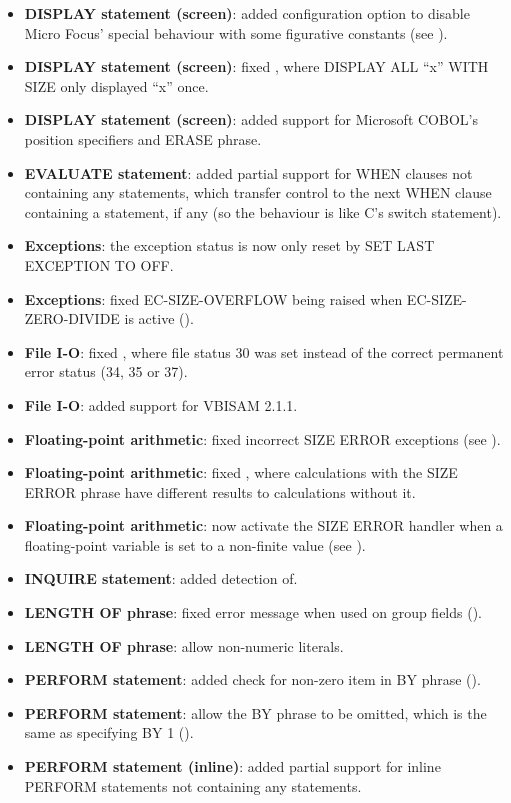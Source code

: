 \begin{itemize}
\item \textbf{DISPLAY statement (screen)}: added configuration option to disable Micro Focus' special behaviour with some figurative constants (see ).
\item \textbf{DISPLAY statement (screen)}: fixed , where DISPLAY ALL ``x'' WITH SIZE only displayed ``x'' once.
\item \textbf{DISPLAY statement (screen)}: added support for Microsoft COBOL's position specifiers and ERASE phrase.
\item \textbf{EVALUATE statement}: added partial support for WHEN clauses not containing any statements, which transfer control to the next WHEN clause containing a statement, if any (so the behaviour is like C's switch statement).
\item \textbf{Exceptions}: the exception status is now only reset by SET LAST EXCEPTION TO OFF.
\item \textbf{Exceptions}: fixed EC-SIZE-OVERFLOW being raised when EC-SIZE-ZERO-DIVIDE is active ().
\item \textbf{File I-O}: fixed , where file status 30 was set instead of the correct permanent error status (34, 35 or 37).
\item \textbf{File I-O}: added support for VBISAM 2.1.1.
\item \textbf{Floating-point arithmetic}: fixed incorrect SIZE ERROR exceptions (see ).
\item \textbf{Floating-point arithmetic}: fixed , where calculations with the SIZE ERROR phrase have different results to calculations without it.
\item \textbf{Floating-point arithmetic}: now activate the SIZE ERROR handler when a floating-point variable is set to a non-finite value (see ).
\item \textbf{INQUIRE statement}: added detection of.
\item \textbf{LENGTH OF phrase}: fixed error message when used on group fields ().
\item \textbf{LENGTH OF phrase}: allow non-numeric literals.
\item \textbf{PERFORM statement}: added check for non-zero item in BY phrase ().
\item \textbf{PERFORM statement}: allow the BY phrase to be omitted, which is the same as specifying BY 1 ().
\item \textbf{PERFORM statement (inline)}: added partial support for inline PERFORM statements not containing any statements.

\end{itemize}
